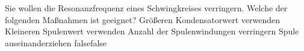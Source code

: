     {Sie wollen die Resonanzfrequenz eines Schwingkreises verringern. Welche der folgenden Maßnahmen ist geeignet?}
    {Größeren Kondensatorwert verwenden}
    {Kleineren Spulenwert verwenden}
    {Anzahl der Spulenwindungen verringern}
    {Spule auseinanderziehen}
    {false}{false}